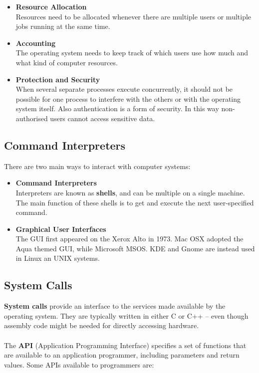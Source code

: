 \documentclass{article}
\begin{document}
\begin{itemize}
	\item \textbf{Resource Allocation}
	\vspace{.2cm} \\
	Resources need to be allocated whenever there are multiple users or multiple jobs running at the same time.
	
	\item \textbf{Accounting}
	\vspace{.2cm} \\
	The operating system needs to keep track of which users use how much and what kind of computer resources.
	
	\item \textbf{Protection and Security}
	\vspace{.2cm} \\
	When several separate processes execute concurrently, it should not be possible for one process to interfere with the others or with the operating system itself. Also authentication is a form of security. In this way non-authorised users cannot access sensitive data.
\end{itemize}

\subsection{Command Interpreters}
There are two main ways to interact with computer systems:

\begin{itemize}
	\item \textbf{Command Interpreters}
	\vspace{.2cm} \\
	Interpreters are known as \textbf{shells}, and can be multiple on a single machine. The main function of these shells is to get and execute the next user-specified command.
	
	\item \textbf{Graphical User Interfaces}
	\vspace{.2cm} \\
	The GUI first appeared on the Xerox Alto in 1973. Mac OSX adopted the Aqua themed GUI, while Microsoft MSOS. KDE and Gnome are instead used in Linux an UNIX systems.
\end{itemize}

\subsection{System Calls}
\textbf{System calls} provide an interface to the services made available by the operating system. They are typically written in either C or C++ -- even though assembly code might be needed for directly accessing hardware. \\ \\
The \textbf{API} (Application Programming Interface) specifies a set of functions that are available to an application programmer, including parameters and return values. Some APIs available to programmers are:
\end{document}
